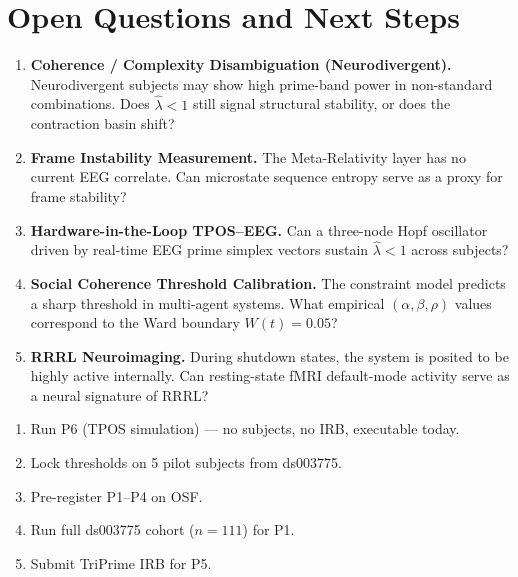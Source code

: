 \documentclass[12pt,a4paper]{article}
\theoremstyle{definition}
\newcommand{\lhat}{\hat{\lambda}}
\begin{document}
\section{Open Questions and Next Steps}

\begin{enumerate}[leftmargin=*, label=\textbf{Q\arabic*.}]
  \item \textbf{Coherence / Complexity Disambiguation (Neurodivergent).}
        Neurodivergent subjects may show high prime-band power in
        non-standard combinations.  Does $\lhat < 1$ still signal
        structural stability, or does the contraction basin shift?

  \item \textbf{Frame Instability Measurement.}
        The Meta-Relativity layer has no current EEG correlate.  Can
        microstate sequence entropy serve as a proxy for frame stability?

  \item \textbf{Hardware-in-the-Loop TPOS--EEG.}
        Can a three-node Hopf oscillator driven by real-time EEG prime
        simplex vectors sustain $\lhat < 1$ across subjects?

  \item \textbf{Social Coherence Threshold Calibration.}
        The constraint model predicts a sharp threshold in multi-agent
        systems.  What empirical $(\alpha, \beta, \rho)$ values
        correspond to the Ward boundary $W(t) = 0.05$?

  \item \textbf{RRRL Neuroimaging.}
        During shutdown states, the system is posited to be highly
        active internally.  Can resting-state fMRI default-mode
        activity serve as a neural signature of RRRL?
\end{enumerate}

\begin{tcolorbox}[note,title={Fastest Path to Validation}]
  \begin{enumerate}[label=\arabic*., leftmargin=*]
    \item Run P6 (TPOS simulation) — no subjects, no IRB, executable today.
    \item Lock thresholds on 5 pilot subjects from ds003775.
    \item Pre-register P1--P4 on OSF.
    \item Run full ds003775 cohort ($n=111$) for P1.
    \item Submit TriPrime IRB for P5.
  \end{enumerate}
\end{tcolorbox}
\end{document}
